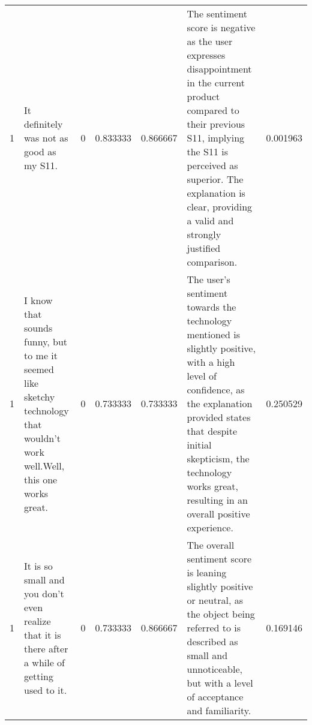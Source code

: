 \begin{tabular}{rlrrrlr}
1 & It definitely was not as good as my S11. & 0 & 0.833333 & 0.866667 & The sentiment score is negative as the user expresses disappointment in the current product compared to their previous S11, implying the S11 is perceived as superior. The explanation is clear, providing a valid and strongly justified comparison. & 0.001963 \\
1 & I know that sounds funny, but to me it seemed like sketchy technology that wouldn't work well.Well, this one works great. & 0 & 0.733333 & 0.733333 & The user's sentiment towards the technology mentioned is slightly positive, with a high level of confidence, as the explanation provided states that despite initial skepticism, the technology works great, resulting in an overall positive experience. & 0.250529 \\
1 & It is so small and you don't even realize that it is there after a while of getting used to it. & 0 & 0.733333 & 0.866667 & The overall sentiment score is leaning slightly positive or neutral, as the object being referred to is described as small and unnoticeable, but with a level of acceptance and familiarity. & 0.169146 \\
\bottomrule
\end{tabular}
